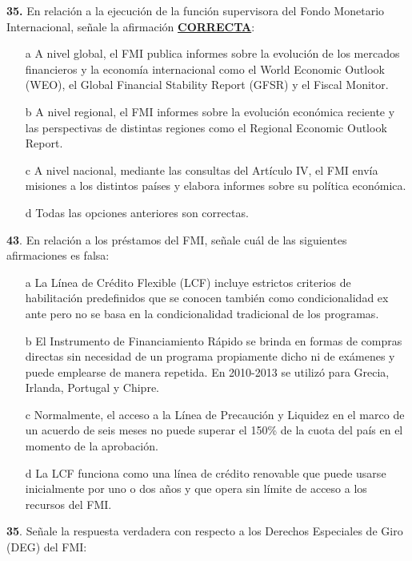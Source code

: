 \documentclass{nuevotema}
\begin{document}

\textbf{35.} En relación a la ejecución de la función supervisora del Fondo Monetario Internacional, señale la afirmación \underline{\textbf{CORRECTA}}:

\begin{itemize}
	\item[a] A nivel global, el FMI publica informes sobre la evolución de los mercados financieros y la economía internacional como el World Economic Outlook (WEO), el Global Financial Stability Report (GFSR) y el Fiscal Monitor.
	\item[b] A nivel regional, el FMI informes sobre la evolución económica reciente y las perspectivas de distintas regiones como el Regional Economic Outlook Report.
	\item[c] A nivel nacional, mediante las consultas del Artículo IV, el FMI envía misiones a los distintos países y elabora informes sobre su política económica. 
	\item[d] Todas las opciones anteriores son correctas.
\end{itemize}

\textbf{43}. En relación a los préstamos del FMI, señale cuál de las siguientes afirmaciones es falsa:

\begin{enumerate}
	\item[a] La Línea de Crédito Flexible (LCF) incluye estrictos criterios de habilitación predefinidos que se conocen también como condicionalidad ex ante pero no se basa en la condicionalidad tradicional de los programas.
	\item[b] El Instrumento de Financiamiento Rápido se brinda en formas de compras directas sin necesidad de un programa propiamente dicho ni de exámenes y puede emplearse de manera repetida. En 2010-2013 se utilizó para Grecia, Irlanda, Portugal y Chipre.
	\item[c] Normalmente, el acceso a la Línea de Precaución y Liquidez en el marco de un acuerdo de seis meses no puede superar el 150\% de la cuota del país en el momento de la aprobación.
	\item[d] La LCF funciona como una línea de crédito renovable que puede usarse inicialmente por uno o dos años y que opera sin límite de acceso a los recursos del FMI.
\end{enumerate}

\textbf{35}. Señale la respuesta verdadera con respecto a los Derechos Especiales de Giro (DEG) del FMI:
\end{document}
